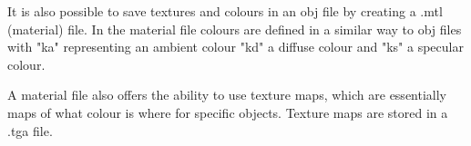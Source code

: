 	It is also possible to save textures and colours in an obj file by creating a .mtl (material) file. In the material file colours are defined in a similar way to obj files with "ka" representing an ambient colour "kd" a diffuse colour and "ks" a specular colour. 
	
	A material file also offers the ability to use texture maps, which are essentially maps of what colour is where for specific objects. Texture maps are stored in a .tga file.
	
	
		

	


